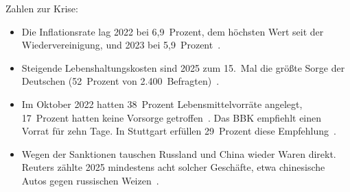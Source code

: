 \documentclass[11pt, a4paper]{article}
\begin{document}
Zahlen zur Krise:
\begin{itemize}
    \item Die Inflationsrate lag 2022 bei 6,9~Prozent, dem höchsten Wert seit
          der Wiedervereinigung, und 2023 bei 5,9~Prozent~\cite{statistikportal}.
    \item Steigende Lebenshaltungskosten sind 2025 zum 15.~Mal die größte
          Sorge der Deutschen (52~Prozent von 2.400~Befragten)~\cite{ruv2025}.
    \item Im Oktober 2022 hatten 38~Prozent Lebensmittelvorräte angelegt,
          17~Prozent hatten keine Vorsorge getroffen~\cite{lmpraxis2022}.
          Das BBK empfiehlt einen Vorrat für zehn Tage. In Stuttgart
          erfüllen 29~Prozent diese Empfehlung~\cite{stuttgart2024}.
    \item Wegen der Sanktionen tauschen Russland und China wieder Waren
          direkt. Reuters zählte 2025 mindestens acht solcher Geschäfte,
          etwa chinesische Autos gegen russischen Weizen~\cite{reuters2025}.
\end{itemize}
\end{document}

